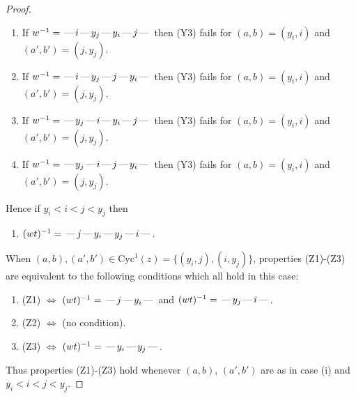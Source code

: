 \documentclass[10pt]{article}
\theoremstyle{definition}
\theoremstyle{definition}
\def\dash{\text{\hspace{0.5mm}---\hspace{0.5mm}}}
\def\Cyc{\mathrm{Cyc}}
\begin{document}
\begin{proof}
\begin{enumerate}
\item If $w^{-1} = \dash i\dash y_j\dash y_i\dash j\dash $ then (Y3) fails for $(a,b)=(y_i,i)$ and $(a',b')=(j,y_j)$.
\item If $w^{-1} = \dash i\dash y_j\dash j\dash y_i\dash $ then (Y3) fails for $(a,b)=(y_i,i)$ and $(a',b')=(j,y_j)$.
\item If $w^{-1} = \dash y_j\dash i\dash y_i\dash j\dash $ then (Y3) fails for $(a,b)=(y_i,i)$ and $(a',b')=(j,y_j)$.
\item If $w^{-1} = \dash y_j\dash i\dash j\dash y_i\dash $ then (Y3) fails for $(a,b)=(y_i,i)$ and $(a',b')=(j,y_j)$.
\end{enumerate}
Hence if $y_i < i < j < y_j$ then \begin{enumerate}\item[] $(wt)^{-1} = \dash j\dash y_i\dash y_j\dash i\dash $. \end{enumerate}
When $(a,b),(a',b')\in\Cyc^1(z)= \{(y_i,j),(i,y_j)\}$,
properties (Z1)-(Z3) are equivalent to the following conditions which all hold in this case:
\begin{enumerate}
\item[](Z1) $\Leftrightarrow$ $(wt)^{-1} = \dash j \dash y_i \dash$  and $(wt)^{-1} = \dash y_j \dash i \dash$.
\item[](Z2) $\Leftrightarrow$ (no condition).
\item[](Z3) $\Leftrightarrow$ $(wt)^{-1} = \dash y_i \dash y_j \dash$.
\end{enumerate}
Thus properties (Z1)-(Z3) hold whenever $(a,b)$, $(a',b')$ are as in case (i) and $y_i < i < j < y_j$.

\end{proof}
\end{document}
